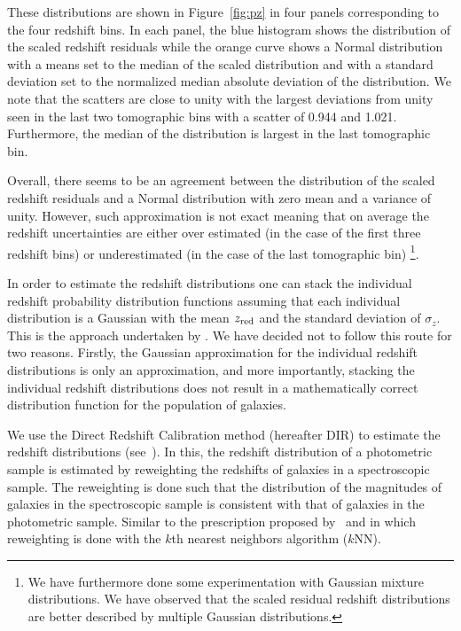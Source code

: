 \documentclass[fleqn,usenatbib,useAMS]{mnras}
\begin{document}
These distributions are shown in Figure~\ref{fig:pz} in four panels corresponding to the four redshift bins. In each panel, the blue histogram shows the distribution of the scaled redshift residuals while the orange curve shows a Normal distribution with a means set to the median of the scaled distribution and with a standard deviation set to the normalized median absolute deviation of the distribution. We note that the scatters are close to unity with the largest deviations from unity seen in the last two tomographic bins with a scatter of 0.944 and 1.021. Furthermore, the median of the distribution is largest in the last tomographic bin.

Overall, there seems to be an agreement between the distribution of the scaled redshift residuals and a Normal distribution with zero mean and a variance of unity. However, such approximation is not exact meaning that on average the redshift uncertainties are either over estimated (in the case of the first three redshift bins) or underestimated (in the case of the last tomographic bin) \footnote{We have furthermore done some experimentation with Gaussian mixture distributions. We have observed that the scaled residual redshift distributions are better described by multiple Gaussian distributions.}. 

In order to estimate the redshift distributions one can stack the individual redshift probability distribution functions assuming that each individual distribution is a Gaussian with the mean $z_{\rm red}$ and the standard deviation of $\sigma_{z}$. This is the approach undertaken by \citet{elvin2017}. We have decided not to follow this route for two reasons. Firstly, the Gaussian approximation for the individual redshift distributions is only an approximation, and more importantly, stacking the individual redshift distributions does not result in a mathematically correct distribution function for the population of galaxies. 

We use the Direct Redshift Calibration method (hereafter DIR) to estimate the redshift distributions (see~\citealt{lima2008, cunha2009}). In this, the redshift distribution of a photometric sample is estimated by reweighting the redshifts of galaxies in a spectroscopic sample. The reweighting is done such that the distribution of the magnitudes of galaxies in the spectroscopic sample is consistent with that of galaxies in the photometric sample. Similar to the prescription proposed by~\citealt{cunha2009} and \citealt{hendrik2018} in which reweighting is done with the $k$th nearest neighbors algorithm ($k$NN). 
\end{document}
